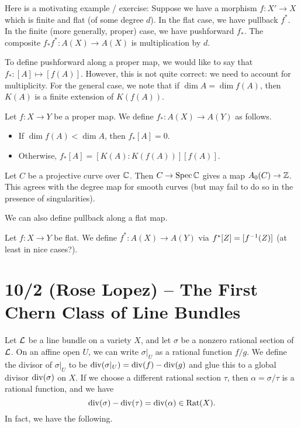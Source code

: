 \documentclass{article}
\begin{document}
Here is a motivating example / exercise:
Suppose we have a morphism $f: X' \to X$ which is finite and flat (of some degree $d$).
In the flat case, we have pullback $f^*$.
In the finite (more generally, proper) case, we have pushforward $f_*$.
The composite $f_* f^*: A(X) \to A(X)$ is multiplication by $d$.

To define pushforward along a proper map, we would like to say that $f_*: [A] \mapsto [f(A)]$.
However, this is not quite correct: we need to account for multiplicity.
For the general case, we note that if $\dim A = \dim f(A)$, then $K(A)$ is a finite extension of $K(f(A))$.

\begin{dfn}
	Let $f: X \to Y$ be a proper map.
	We define $f_*: A(X) \to A(Y)$ as follows.
	\begin{itemize}
		\item If $\dim f(A) < \dim A$, then $f_*[A] = 0$.
		\item Otherwise, $f_*[A] = [K(A) : K(f(A))] [f(A)]$.
	\end{itemize}
\end{dfn}

\begin{ex}
	Let $C$ be a projective curve over $\mathbb{C}$.
	Then $C \to \operatorname{Spec} \mathbb{C}$ gives a map $A_0(C) \to \mathbb{Z}$.
	This agrees with the degree map for smooth curves (but may fail to do so in the presence of singularities).
\end{ex}

We can also define pullback along a flat map.

\begin{dfn}
	Let $f: X \to Y$ be flat.
	We define $f^*: A(X) \to A(Y)$ via $f^*[Z] = [f^{-1}(Z)]$ (at least in nice cases?).
\end{dfn}

\section{10/2 (Rose Lopez) -- The First Chern Class of Line Bundles}

Let $\mathcal{L}$ be a line bundle on a variety $X$, and let $\sigma$ be a nonzero rational section of $\mathcal{L}$.
On an affine open $U$, we can write $\sigma|_U$ as a rational function $f / g$.
We define the divisor of $\sigma|_U$ to be $\operatorname{div}(\sigma|_U) = \operatorname{div}(f) - \operatorname{div}(g)$ and glue this to a global divisor $\operatorname{div}(\sigma)$ on $X$.
If we choose a different rational section $\tau$, then $\alpha = \sigma / \tau$ is a rational function, and we have 
\[
	\operatorname{div}(\sigma) - \operatorname{div}(\tau) = \operatorname{div}(\alpha) \in \operatorname{Rat}(X).
\]
In fact, we have the following.
\end{document}
